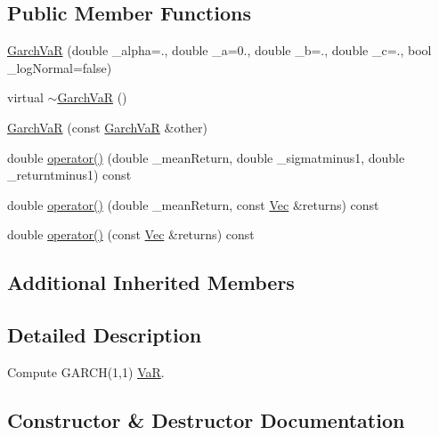 \subsection*{Public Member Functions}
\begin{DoxyCompactItemize}
\item 
\hyperlink{classGarchVaR_a90617aa33c7b190422bc3cfda282167b}{Garch\+VaR} (double \+\_\+alpha=., double \+\_\+a=0., double \+\_\+b=., double \+\_\+c=., bool \+\_\+log\+Normal=false)
\item 
virtual \hyperlink{classGarchVaR_aa95d7d35fad664439c72013528b6f7e1}{$\sim$\+Garch\+VaR} ()
\item 
\hyperlink{classGarchVaR_a5a8f06045676f3e8776bf49f08bea635}{Garch\+VaR} (const \hyperlink{classGarchVaR}{Garch\+VaR} \&other)
\item 
double \hyperlink{classGarchVaR_a6aec8c89e48d2b2f356669ed3300f456}{operator()} (double \+\_\+mean\+Return, double \+\_\+sigmatminus1, double \+\_\+returntminus1) const
\item 
double \hyperlink{classGarchVaR_ab7e9583566b26a64017edbbfb63f3e89}{operator()} (double \+\_\+mean\+Return, const \hyperlink{compute__returns__eigen_8h_a1eb6a9306ef406d7975f3cbf2e247777}{Vec} \&returns) const
\item 
double \hyperlink{classGarchVaR_ac6d01b6567a6d0629cd95be716677763}{operator()} (const \hyperlink{compute__returns__eigen_8h_a1eb6a9306ef406d7975f3cbf2e247777}{Vec} \&returns) const
\end{DoxyCompactItemize}
\subsection*{Additional Inherited Members}


\subsection{Detailed Description}
Compute G\+A\+R\+C\+H(1,1) \hyperlink{classVaR}{VaR}. 

\subsection{Constructor \& Destructor Documentation}
\hypertarget{classGarchVaR_a90617aa33c7b190422bc3cfda282167b}{}\label{classGarchVaR_a90617aa33c7b190422bc3cfda282167b} 

